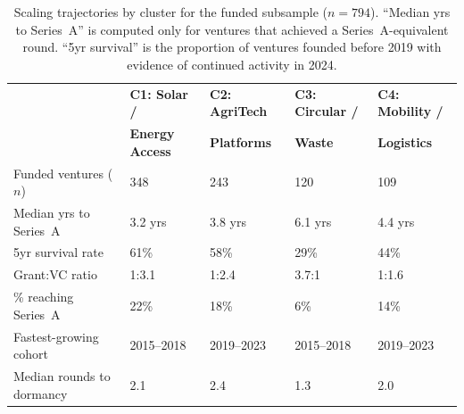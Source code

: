 \documentclass[review,12pt]{elsarticle}
\begin{document}
\begin{table}[htbp]
\centering
\caption{Scaling trajectories by cluster for the funded subsample
  ($n = 794$). ``Median yrs to Series~A'' is computed only for
  ventures that achieved a Series~A-equivalent round. ``5yr
  survival'' is the proportion of ventures founded before 2019 with
  evidence of continued activity in 2024.}
\label{tab:scaling_trajectories}
\small
\begin{tabularx}{\linewidth}{@{}lXXXX@{}}
\toprule
 & \textbf{C1: Solar /} & \textbf{C2: AgriTech} &
   \textbf{C3: Circular /} & \textbf{C4: Mobility /} \\
 & \textbf{Energy Access} & \textbf{Platforms} &
   \textbf{Waste} & \textbf{Logistics} \\
\midrule
Funded ventures ($n$) & 348 & 243 & 120 & 109 \\[3pt]
Median yrs to Series~A & 3.2 yrs & 3.8 yrs & 6.1 yrs & 4.4 yrs \\[3pt]
5yr survival rate & 61\% & 58\% & 29\% & 44\% \\[3pt]
Grant:VC ratio & 1:3.1 & 1:2.4 & 3.7:1 & 1:1.6 \\[3pt]
\% reaching Series~A & 22\% & 18\% & 6\% & 14\% \\[3pt]
Fastest-growing cohort & 2015--2018 & 2019--2023 & 2015--2018 &
                          2019--2023 \\[3pt]
Median rounds to dormancy & 2.1 & 2.4 & 1.3 & 2.0 \\
\bottomrule
\end{tabularx}
\end{table}
\end{document}
